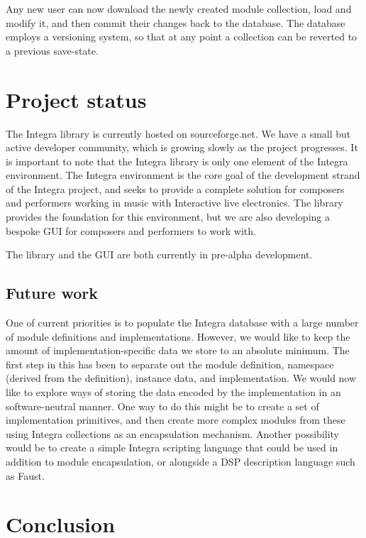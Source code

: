 \documentclass{article}
\begin{document}
Any new user can now download the newly created module collection, load and modify it, and then commit their changes back to the database. The database employs a versioning system, so that at any point a collection can be reverted to a previous save-state.

\section{Project status}\label{sec:status}

The Integra library is currently hosted on sourceforge.net. We have a small but active developer community, which is growing slowly as the project progresses. It is important to note that the Integra library is only one element of the Integra environment. The Integra environment is the core goal of the development strand of the Integra project, and seeks to provide a complete solution for composers and performers working in music with Interactive live electronics. The library provides the foundation for this environment, but we are also developing a bespoke GUI for composers and performers to work with.

The library and the GUI are both currently in pre-alpha development.

\subsection{Future work}\label{subsec:future}

One of current priorities is to populate the Integra database with a large number of module definitions and implementations. However, we would like to keep the amount of implementation-specific data we store to an absolute minimum. The first step in this has been to separate out the module definition, namespace (derived from the definition), instance data, and implementation. We would now like to explore ways of storing the data encoded by the implementation in an software-neutral manner. One way to do this might be to create a set of implementation primitives, and then create more complex modules from these using Integra collections as an encapsulation mechanism. Another possibility would be to create a simple Integra scripting language that could be used in addition to module encapsulation, or alongside a DSP description language such as Faust. 

\section{Conclusion}\label{sec:conclusion}
\end{document}
